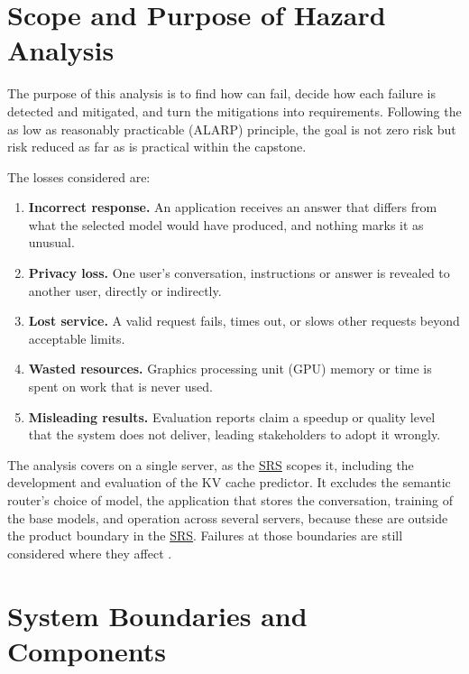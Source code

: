 \documentclass{article}
\newcommand{\srs}{\href{../SRS-Volere/SRS.pdf}{SRS}}
\begin{document}
\section{Scope and Purpose of Hazard Analysis}
\label{sec:scope}

The purpose of this analysis is to find how \progname{} can fail, decide
how each failure is detected and mitigated, and turn the mitigations into
requirements. Following the as low as reasonably practicable (ALARP)
principle, the goal is not zero risk but risk reduced as far as is
practical within the capstone.

The losses considered are:
\begin{enumerate}[label=L\arabic*., ref=L\arabic*]
  \item \label{loss:wrong} \textbf{Incorrect response.} An application
  receives an answer that differs from what the selected model would have
  produced, and nothing marks it as unusual.
  \item \label{loss:privacy} \textbf{Privacy loss.} One user's
  conversation, instructions or answer is revealed to another user,
  directly or indirectly.
  \item \label{loss:service} \textbf{Lost service.} A valid request
  fails, times out, or slows other requests beyond acceptable limits.
  \item \label{loss:waste} \textbf{Wasted resources.} Graphics processing
  unit (GPU) memory or time is spent on work that is never used.
  \item \label{loss:claims} \textbf{Misleading results.} Evaluation reports
  claim a speedup or quality level that the system does not deliver,
  leading stakeholders to adopt it wrongly.
\end{enumerate}

The analysis covers \progname{} on a single server, as the \srs{} scopes
it, including the development and evaluation of the KV cache predictor. It
excludes the semantic router's choice of model, the application that
stores the conversation, training of the base models, and operation across
several servers, because these are outside the product boundary in the
\srs{}. Failures at those boundaries are still considered where they
affect \progname{}.

\section{System Boundaries and Components}
\label{sec:components}
\end{document}

